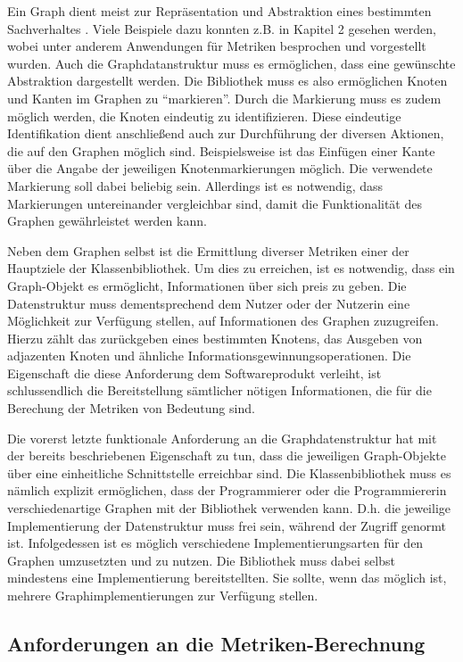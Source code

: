 \documentclass[a4paper,12pt,ngerman,chapterprefix=false,listof=totoc,bibliography=totoc]{scrreprt}
\begin{document}
{{{Ein Graph dient meist zur Repräsentation und Abstraktion eines bestimmten Sachverhaltes \cite{turau_algorithmische_2004}. Viele Beispiele dazu konnten z.B. in Kapitel 2 gesehen werden, wobei unter anderem Anwendungen für Metriken besprochen und vorgestellt wurden. Auch die Graphdatanstruktur muss es ermöglichen, dass eine gewünschte Abstraktion dargestellt werden. Die Bibliothek muss es also ermöglichen Knoten und Kanten im Graphen zu "`markieren"'. Durch die Markierung muss es zudem möglich werden, die Knoten eindeutig zu identifizieren. Diese eindeutige Identifikation dient anschließend auch zur Durchführung der diversen Aktionen, die auf den Graphen möglich sind. Beispielsweise ist das Einfügen einer Kante über die Angabe der jeweiligen Knotenmarkierungen möglich. Die verwendete Markierung soll dabei beliebig sein. Allerdings ist es notwendig, dass Markierungen untereinander vergleichbar sind, damit die Funktionalität des Graphen gewährleistet werden kann.

Neben dem Graphen selbst ist die Ermittlung diverser Metriken einer der Hauptziele der Klassenbibliothek. Um dies zu erreichen, ist es notwendig, dass ein Graph-Objekt es ermöglicht, Informationen über sich preis zu geben. Die Datenstruktur muss dementsprechend dem Nutzer oder der Nutzerin eine Möglichkeit zur Verfügung stellen, auf Informationen des Graphen zuzugreifen. Hierzu zählt das zurückgeben eines bestimmten Knotens, das Ausgeben von adjazenten Knoten und ähnliche Informationsgewinnungsoperationen. Die Eigenschaft die diese Anforderung dem Softwareprodukt verleiht, ist schlussendlich die Bereitstellung sämtlicher nötigen Informationen, die für die Berechung der Metriken von Bedeutung sind.

Die vorerst letzte funktionale Anforderung an die Graphdatenstruktur hat mit der bereits beschriebenen Eigenschaft zu tun, dass die jeweiligen Graph-Objekte über eine einheitliche Schnittstelle erreichbar sind. Die Klassenbibliothek muss es nämlich explizit ermöglichen, dass der Programmierer oder die Programmiererin verschiedenartige Graphen mit der Bibliothek verwenden kann. D.h. die jeweilige Implementierung der Datenstruktur muss frei sein, während der Zugriff genormt ist. Infolgedessen ist es möglich verschiedene Implementierungsarten für den Graphen umzusetzten und zu nutzen. Die Bibliothek muss dabei selbst mindestens eine Implementierung bereitstellten. Sie sollte, wenn das möglich ist, mehrere Graphimplementierungen zur Verfügung stellen. 
}
\subsection{Anforderungen an die Metriken-Berechnung}


}}
\end{document}
